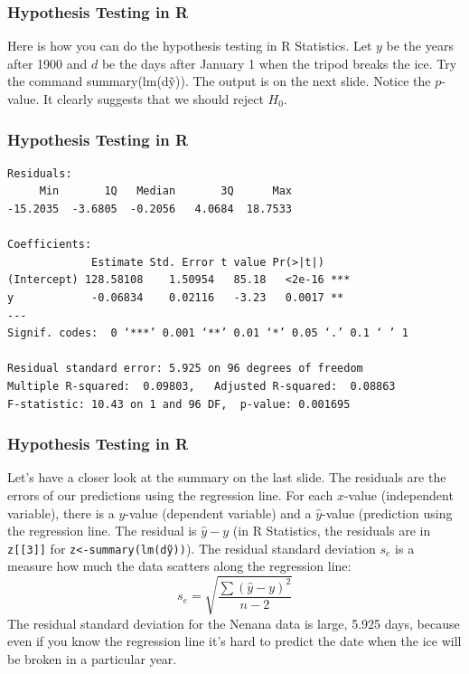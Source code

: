 \documentclass[xcolor=dvipsnames]{beamer}
\begin{document}
\begin{frame}
  \frametitle{Hypothesis Testing in R}
  Here is how you can do the hypothesis testing in R Statistics.
  Let $y$ be the years after 1900 and $d$ be the days after January 1
  when the tripod breaks the ice. Try the command
  \textrm{summary(lm(d\~y))}. The output is on the next slide. Notice
  the $p$-value. It clearly suggests that we should reject $H_{0}$.
\end{frame}

\begin{frame}
  \frametitle{Hypothesis Testing in R}
\begin{verbatim}
Residuals:
     Min       1Q   Median       3Q      Max 
-15.2035  -3.6805  -0.2056   4.0684  18.7533 

Coefficients:
             Estimate Std. Error t value Pr(>|t|)    
(Intercept) 128.58108    1.50954   85.18   <2e-16 ***
y            -0.06834    0.02116   -3.23   0.0017 ** 
---
Signif. codes:  0 ‘***’ 0.001 ‘**’ 0.01 ‘*’ 0.05 ‘.’ 0.1 ‘ ’ 1

Residual standard error: 5.925 on 96 degrees of freedom
Multiple R-squared:  0.09803,	Adjusted R-squared:  0.08863 
F-statistic: 10.43 on 1 and 96 DF,  p-value: 0.001695
\end{verbatim}
\end{frame}

\begin{frame}
  \frametitle{Hypothesis Testing in R}
  Let's have a closer look at the summary on the last slide. The
  \alert{residuals} are the errors of our predictions using the
  regression line. For each $x$-value (independent variable), there is
  a $y$-value (dependent variable) and a $\hat{y}$-value (prediction
  using the regression line. The residual is $\hat{y}-y$ (in R
  Statistics, the residuals are in \texttt{z[[3]]} for
  \texttt{z<-summary(lm(d\~y))}). The residual standard deviation
  $s_{e}$ is a measure how much the data scatters along the regression
  line:
  \begin{equation}
    \label{eq:eilokaqu}
    s_{e}=\sqrt{\frac{\sum(\hat{y}-y)^{2}}{n-2}}
  \end{equation}
  The residual standard deviation for the Nenana data is large, 5.925
  days, because even if you know the regression line it's hard to
  predict the date when the ice will be broken in a particular year.
\end{frame}
\end{document}
